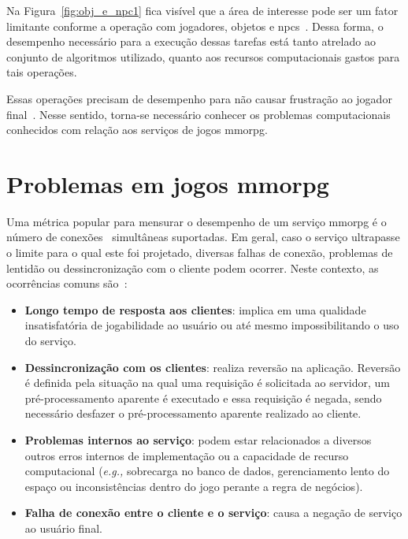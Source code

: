Na Figura~\ref{fig:obj_e_npc1} fica visível que a área de interesse pode ser um fator limitante conforme a operação com jogadores, objetos e \acp{npc}~\cite{albion_online_unite}.
%
Dessa forma, o desempenho necessário para a execução dessas tarefas está tanto atrelado ao conjunto de algoritmos utilizado, quanto aos recursos computacionais gastos para tais operações.


Essas operações precisam de desempenho para não causar frustração ao jogador final~\cite{7008965}.
%
Nesse sentido, torna-se necessário conhecer os problemas computacionais conhecidos com relação aos serviços de jogos \ac{mmorpg}.



\section{Problemas em jogos \ac{mmorpg}}
\label{sec:problemas}

Uma métrica popular para mensurar o desempenho de um serviço \ac{mmorpg} é o número de conexões~\cite{1417630} simultâneas suportadas.
%
Em geral, caso o serviço ultrapasse o limite para o qual este foi projetado, diversas falhas de conexão, problemas de lentidão ou dessincronização com o cliente podem ocorrer.
%
Neste contexto, as ocorrências comuns são~\cite{1417630}:

\begin{itemize}
  \item \textbf{Longo tempo de resposta aos clientes}: implica em uma qualidade insatisfatória de jogabilidade ao usuário ou até mesmo impossibilitando o uso do serviço.
  \item \textbf{Dessincronização com os clientes}: realiza reversão na aplicação. Reversão é definida pela situação na qual uma requisição é solicitada ao servidor, um pré-processamento aparente é executado e essa requisição é negada, sendo necessário desfazer o pré-processamento aparente realizado ao cliente.
  \item \textbf{Problemas internos ao serviço}:  podem estar relacionados a diversos outros erros internos de implementação ou a capacidade de recurso computacional (\textit{e.g.,} sobrecarga no banco de dados, gerenciamento lento do espaço ou inconsistências dentro do jogo perante a regra de negócios).
  \item \textbf{Falha de conexão entre o cliente e o serviço}: causa a negação de serviço ao usuário final.
\end{itemize}

